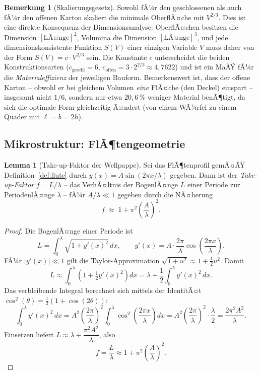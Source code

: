 ﻿\documentclass[a4paper,12pt]{article}
\theoremstyle{definition}
\newtheorem{lemma}{Lemma}
\newtheorem{bemerkung}{Bemerkung}
\begin{document}
\begin{bemerkung}[Skalierungsgesetz]
	Sowohl fÃ¼r den geschlossenen als auch fÃ¼r den offenen Karton skaliert die
	minimale OberflÃ¤che mit $V^{2/3}$. Dies ist eine direkte Konsequenz der
	Dimensionsanalyse: OberflÃ¤chen besitzen die Dimension $[\text{LÃ¤nge}]^2$,
	Volumina die Dimension $[\text{LÃ¤nge}]^3$, und jede dimensionskonsistente
	Funktion $S(V)$ einer einzigen Variable $V$ muss daher von der Form
	$S(V) = c \cdot V^{2/3}$ sein. Die Konstante $c$ unterscheidet die beiden
	Konstruktionsarten ($c_{\mathrm{geschl}} = 6$, $c_{\mathrm{offen}} = 3 \cdot
	2^{2/3} \approx 4{,}7622$) und ist ein MaÃŸ fÃ¼r die \emph{Materialeffizienz}
	der jeweiligen Bauform. Bemerkenswert ist, dass der offene Karton -- obwohl
	er bei gleichem Volumen \emph{eine} FlÃ¤che (den Deckel) einspart --
	insgesamt nicht $1/6$, sondern nur etwa $20{,}6\,\%$ weniger Material
	benÃ¶tigt, da sich die optimale Form gleichzeitig Ã¤ndert (von einem WÃ¼rfel zu
	einem Quader mit $\ell = b = 2h$).
\end{bemerkung}

\subsection{Mikrostruktur: FlÃ¶tengeometrie}

\begin{lemma}[Take-up-Faktor der Wellpappe]
	\label{lem:takeup}
	Sei das FlÃ¶tenprofil gemÃ¤ÃŸ Definition~\ref{def:flute} durch
	$y(x) = A\sin(2\pi x/\lambda)$ gegeben. Dann ist der
	\emph{Take-up-Faktor} $f = L/\lambda$ -- das VerhÃ¤ltnis der BogenlÃ¤nge $L$
	einer Periode zur PeriodenlÃ¤nge $\lambda$ -- fÃ¼r $A/\lambda \ll 1$ gegeben
	durch die NÃ¤herung
	\[
		f \;\approx\; 1 + \pi^2 \left(\frac{A}{\lambda}\right)^2.
	\]
\end{lemma}

\begin{proof}
	Die BogenlÃ¤nge einer Periode ist
	\[
		L = \int_0^\lambda \sqrt{1 + y'(x)^2}\,dx, \qquad
		y'(x) = A \cdot \frac{2\pi}{\lambda}\cos\!\left(\frac{2\pi x}{\lambda}\right).
	\]
	FÃ¼r $|y'(x)| \ll 1$ gilt die Taylor-Approximation
	$\sqrt{1+u^2} \approx 1 + \tfrac{1}{2}u^2$. Damit
	\[
		L \approx \int_0^\lambda \left(1 + \tfrac{1}{2}y'(x)^2\right) dx
		= \lambda + \frac{1}{2}\int_0^\lambda y'(x)^2\,dx.
	\]
	Das verbleibende Integral berechnet sich mittels der IdentitÃ¤t
	$\cos^2(\theta) = \tfrac{1}{2}(1+\cos(2\theta))$:
	\[
		\int_0^\lambda y'(x)^2\,dx
		= A^2 \left(\frac{2\pi}{\lambda}\right)^2
		\int_0^\lambda \cos^2\!\left(\frac{2\pi x}{\lambda}\right) dx
		= A^2 \left(\frac{2\pi}{\lambda}\right)^2 \cdot \frac{\lambda}{2}
		= \frac{2\pi^2 A^2}{\lambda}.
	\]
	Einsetzen liefert
	$L \approx \lambda + \dfrac{\pi^2 A^2}{\lambda}$, also
	\[
		f = \frac{L}{\lambda} \approx 1 + \pi^2\left(\frac{A}{\lambda}\right)^2.
	\]
\end{proof}
\end{document}
